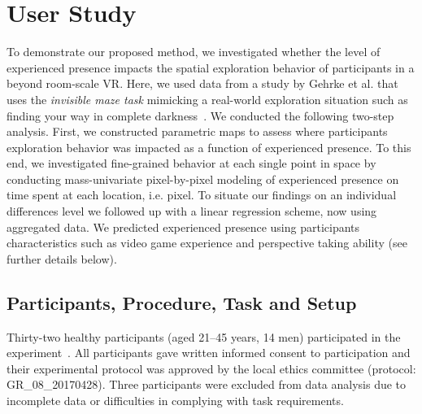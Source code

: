 \section{User Study}
To demonstrate our proposed method, we investigated whether the level of experienced presence impacts the spatial exploration behavior of participants in a beyond room-scale VR. Here, we used data from a study by Gehrke et al. that uses the \textit{invisible maze task} mimicking a real-world exploration situation such as finding your way in complete darkness~\cite{Gehrke2018, Miyakoshi2021-ni, Gehrke2021-ml}. We conducted the following two-step analysis. First, we constructed parametric maps to assess where participants exploration behavior was impacted as a function of experienced presence. To this end, we investigated fine-grained behavior at each single point in space by conducting mass-univariate pixel-by-pixel modeling of experienced presence on time spent at each location, i.e. pixel. To situate our findings on an individual differences level we followed up with a linear regression scheme, now using aggregated data. We predicted experienced presence using participants characteristics such as video game experience and perspective taking ability (see further details below).

\subsection{Participants, Procedure, Task and Setup} Thirty-two healthy participants (aged 21--45 years, 14 men) participated in the experiment~\cite{Gehrke2018, Gehrke2021-ml}. All participants gave written informed consent to participation and their experimental protocol was approved by the local ethics committee (protocol: GR\_08\_20170428). Three participants were excluded from data analysis due to incomplete data or difficulties in complying with task requirements.

